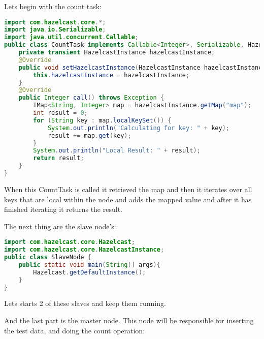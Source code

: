 Lets begin with the count task:
\begin{lstlisting}[language=java]
import com.hazelcast.core.*;
import java.io.Serializable;
import java.util.concurrent.Callable;
public class CountTask implements Callable<Integer>, Serializable, HazelcastInstanceAware {
    private transient HazelcastInstance hazelcastInstance;
    @Override
    public void setHazelcastInstance(HazelcastInstance hazelcastInstance) {
        this.hazelcastInstance = hazelcastInstance;
    }
    @Override
    public Integer call() throws Exception {
        IMap<String, Integer> map = hazelcastInstance.getMap("map");
        int result = 0;
        for (String key : map.localKeySet()) {
            System.out.println("Calculating for key: " + key);
            result += map.get(key);
        }
        System.out.println("Local Result: " + result);
        return result;
    }
}

\end{lstlisting}
When this CountTask is called it retrieved the map and then it iterates over all keys that are local within the node and adds the mapped value and after it has finished iterating it returns the result.

The next thing are the slave node's:
\begin{lstlisting}[language=java]
import com.hazelcast.core.Hazelcast;
import com.hazelcast.core.HazelcastInstance;
public class SlaveNode {
    public static void main(String[] args){
        Hazelcast.getDefaultInstance();
    }
}
\end{lstlisting}
Lets starts 2 of these slaves and keep them running.

And the last part is the master node. This node will be responsible for inserting the test data, and doing the count operation:

